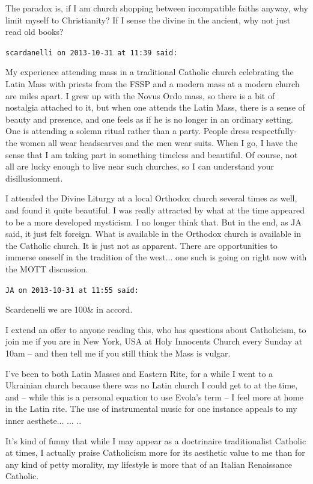 \begin{footnotesize}
\begin{sffamily}
The paradox is, if I am church shopping between incompatible faiths anyway, why limit myself to Christianity? If I sense the divine in the ancient, why not just read old books?

\hfill

\texttt{scardanelli on 2013-10-31 at 11:39 said:}

My experience attending mass in a traditional Catholic church celebrating the Latin Mass with priests from the FSSP and a modern mass at a modern church are miles apart. I grew up with the Novus Ordo mass, so there is a bit of nostalgia attached to it, but when one attends the Latin Mass, there is a sense of beauty and presence, and one feels as if he is no longer in an ordinary setting. One is attending a solemn ritual rather than a party. People dress respectfully- the women all wear headscarves and the men wear suits. When I go, I have the sense that I am taking part in something timeless and beautiful. Of course, not all are lucky enough to live near such churches, so I can understand your disillusionment.

I attended the Divine Liturgy at a local Orthodox church several times as well, and found it quite beautiful. I was really attracted by what at the time appeared to be a more developed mysticism. I no longer think that. But in the end, as JA said, it just felt foreign. What is available in the Orthodox church is available in the Catholic church. It is just not as apparent. There are opportunities to immerse oneself in the tradition of the west... one such is going on right now with the MOTT discussion.

\hfill

\texttt{JA on 2013-10-31 at 11:55 said:}

Scardenelli we are 100\& in accord.

I extend an offer to anyone reading this, who has questions about Catholicism, to join me if you are in New York, USA at Holy Innocents Church every Sunday at 10am -- and then tell me if you still think the Mass is vulgar.

I've been to both Latin Masses and Eastern Rite, for a while I went to a Ukrainian church because there was no Latin church I could get to at the time, and -- while this is a personal equation to use Evola's term -- I feel more at home in the Latin rite. The use of instrumental music for one instance appeals to my inner aesthete... ... ..

It's kind of funny that while I may appear as a doctrinaire traditionalist Catholic at times, I actually praise Catholicism more for its aesthetic value to me than for any kind of petty morality, my lifestyle is more that of an Italian Renaissance Catholic.


\end{sffamily}
\end{footnotesize}

